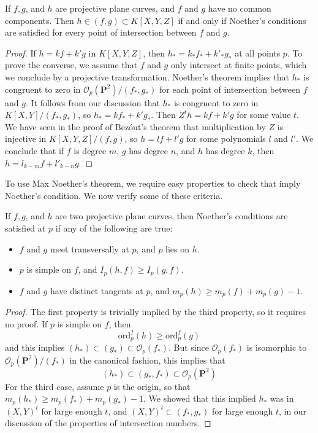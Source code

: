 \begin{theorem}
    If $f,g$, and $h$ are projective plane curves, and $f$ and $g$ have no common components. Then $h \in (f,g) \subset K[X,Y,Z]$ if and only if Noether's conditions are satisfied for every point of intersection between $f$ and $g$.
\end{theorem}
\begin{proof}
    If $h = kf + k'g$ in $K[X,Y,Z]$, then $h_* = k_*f_* + k'_* g_*$ at all points $p$. To prove the converse, we assume that $f$ and $g$ only intersect at finite points, which we conclude by a projective transformation. Noether's theorem implies that $h_*$ is congruent to zero in $\mathcal{O}_p(\mathbf{P}^2)/(f_*,g_*)$ for each point of intersection between $f$ and $g$. It follows from our discussion that $h_*$ is congruent to zero in $K[X,Y]/(f_*,g_*)$, so $h_* = kf_* + k'g_*$. Then $Z^th = kf + k'g$ for some value $t$. We have seen in the proof of Bez\'{o}ut's theorem that multiplication by $Z$ is injective in $K[X,Y,Z]/(f,g)$, so $h = lf + l'g$ for some polynomials $l$ and $l'$. We conclude that if $f$ is degree $m$, $g$ has degree $n$, and $h$ has degree $k$, then $h = l_{k-m}f + l'_{k-n}g$.
\end{proof}

To use Max Noether's theorem, we require easy properties to check that imply Noether's condition. We now verify some of these criteria.

\begin{theorem}
    If $f,g$, and $h$ are two projective plane curves, then Noether's conditions are satisfied at $p$ if any of the following are true:
    \begin{itemize}
        \item $f$ and $g$ meet transversally at $p$, and $p$ lies on $h$.
        \item $p$ is simple on $f$, and $I_p(h,f) \geq I_p(g,f)$.
        \item $f$ and $g$ have distinct tangents at $p$, and $m_p(h) \geq m_p(f) + m_p(g) - 1$.
    \end{itemize}
\end{theorem}
\begin{proof}
    The first property is trivially implied by the third property, so it requires no proof. If $p$ is simple on $f$, then
    \[ \text{ord}_p^f(h) \geq \text{ord}_p^f(g) \]
    and this implies $(h_*) \subset (g_*) \subset \mathcal{O}_p(f_*)$. But since $\mathcal{O}_p(f_*)$ is isomorphic to $\mathcal{O}_p(\mathbf{P}^2)/(f_*)$ in the canonical fashion, this implies that
    \[ (h_*) \subset (g_*,f_*) \subset \mathcal{O}_p(\mathbf{P}^2) \]
    For the third case, assume $p$ is the origin, so that $m_p(h_*) \geq m_p(f_*) + m_p(g_*) - 1$. We showed that this implied $h_*$ was in $(X,Y)^t$ for large enough $t$, and $(X,Y)^t \subset (f_*,g_*)$ for large enough $t$, in our discussion of the properties of intersection numbers.
\end{proof}

